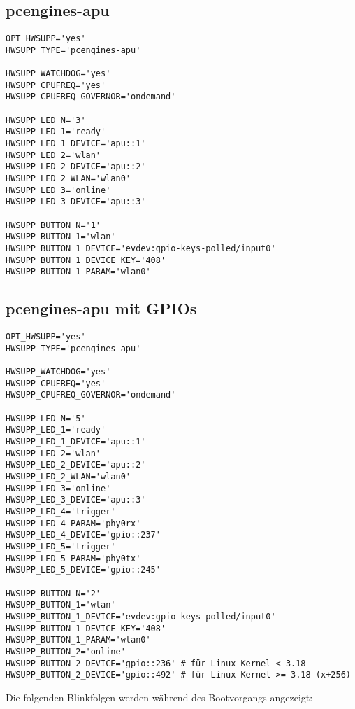 \subsection{pcengines-apu}

\begin{verbatim}
OPT_HWSUPP='yes'
HWSUPP_TYPE='pcengines-apu'

HWSUPP_WATCHDOG='yes'
HWSUPP_CPUFREQ='yes'
HWSUPP_CPUFREQ_GOVERNOR='ondemand'

HWSUPP_LED_N='3'
HWSUPP_LED_1='ready'
HWSUPP_LED_1_DEVICE='apu::1'
HWSUPP_LED_2='wlan'
HWSUPP_LED_2_DEVICE='apu::2'
HWSUPP_LED_2_WLAN='wlan0'
HWSUPP_LED_3='online'
HWSUPP_LED_3_DEVICE='apu::3'

HWSUPP_BUTTON_N='1'
HWSUPP_BUTTON_1='wlan'
HWSUPP_BUTTON_1_DEVICE='evdev:gpio-keys-polled/input0'
HWSUPP_BUTTON_1_DEVICE_KEY='408'
HWSUPP_BUTTON_1_PARAM='wlan0'
\end{verbatim}

\subsection{pcengines-apu mit GPIOs}

\begin{verbatim}
OPT_HWSUPP='yes'
HWSUPP_TYPE='pcengines-apu'

HWSUPP_WATCHDOG='yes'
HWSUPP_CPUFREQ='yes'
HWSUPP_CPUFREQ_GOVERNOR='ondemand'

HWSUPP_LED_N='5'
HWSUPP_LED_1='ready'
HWSUPP_LED_1_DEVICE='apu::1'
HWSUPP_LED_2='wlan'
HWSUPP_LED_2_DEVICE='apu::2'
HWSUPP_LED_2_WLAN='wlan0'
HWSUPP_LED_3='online'
HWSUPP_LED_3_DEVICE='apu::3'
HWSUPP_LED_4='trigger'
HWSUPP_LED_4_PARAM='phy0rx'
HWSUPP_LED_4_DEVICE='gpio::237'
HWSUPP_LED_5='trigger'
HWSUPP_LED_5_PARAM='phy0tx'
HWSUPP_LED_5_DEVICE='gpio::245'

HWSUPP_BUTTON_N='2'
HWSUPP_BUTTON_1='wlan'
HWSUPP_BUTTON_1_DEVICE='evdev:gpio-keys-polled/input0'
HWSUPP_BUTTON_1_DEVICE_KEY='408'
HWSUPP_BUTTON_1_PARAM='wlan0'
HWSUPP_BUTTON_2='online'
HWSUPP_BUTTON_2_DEVICE='gpio::236' # für Linux-Kernel < 3.18
HWSUPP_BUTTON_2_DEVICE='gpio::492' # für Linux-Kernel >= 3.18 (x+256)
\end{verbatim}

  Die folgenden Blinkfolgen werden während des Bootvorgangs angezeigt:
  
